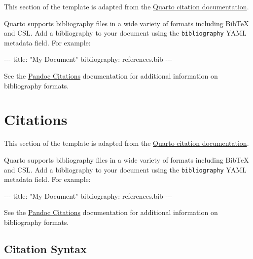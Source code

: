 \documentclass[
]{interact}
\newenvironment{Shaded}{\begin{snugshade}}{\end{snugshade}}
\newcommand{\AttributeTok}[1]{\textcolor[rgb]{0.40,0.45,0.13}{#1}}
\newcommand{\FunctionTok}[1]{\textcolor[rgb]{0.28,0.35,0.67}{#1}}
\newcommand{\KeywordTok}[1]{\textcolor[rgb]{0.00,0.23,0.31}{#1}}
\newcommand{\PreprocessorTok}[1]{\textcolor[rgb]{0.68,0.00,0.00}{#1}}
\newcommand{\StringTok}[1]{\textcolor[rgb]{0.13,0.47,0.30}{#1}}
\begin{document}
This section of the template is adapted from the
\href{https://quarto.org/docs/authoring/footnotes-and-citations.html}{Quarto
citation documentation}.

Quarto supports bibliography files in a wide variety of formats
including BibTeX and CSL. Add a bibliography to your document using the
\texttt{bibliography} YAML metadata field. For example:

\begin{Shaded}
\begin{Highlighting}[]
\PreprocessorTok{{-}{-}{-}}
\FunctionTok{title}\KeywordTok{:}\AttributeTok{ }\StringTok{"My Document"}
\FunctionTok{bibliography}\KeywordTok{:}\AttributeTok{ references.bib}
\PreprocessorTok{{-}{-}{-}}
\end{Highlighting}
\end{Shaded}

See the \href{https://pandoc.org/MANUAL.html\#citations}{Pandoc
Citations} documentation for additional information on bibliography
formats.

\section{Citations}\label{citations-1}

This section of the template is adapted from the
\href{https://quarto.org/docs/authoring/footnotes-and-citations.html}{Quarto
citation documentation}.

Quarto supports bibliography files in a wide variety of formats
including BibTeX and CSL. Add a bibliography to your document using the
\texttt{bibliography} YAML metadata field. For example:

\begin{Shaded}
\begin{Highlighting}[]
\PreprocessorTok{{-}{-}{-}}
\FunctionTok{title}\KeywordTok{:}\AttributeTok{ }\StringTok{"My Document"}
\FunctionTok{bibliography}\KeywordTok{:}\AttributeTok{ references.bib}
\PreprocessorTok{{-}{-}{-}}
\end{Highlighting}
\end{Shaded}

See the \href{https://pandoc.org/MANUAL.html\#citations}{Pandoc
Citations} documentation for additional information on bibliography
formats.

\subsection{Citation Syntax}\label{sec-citations}
\end{document}
